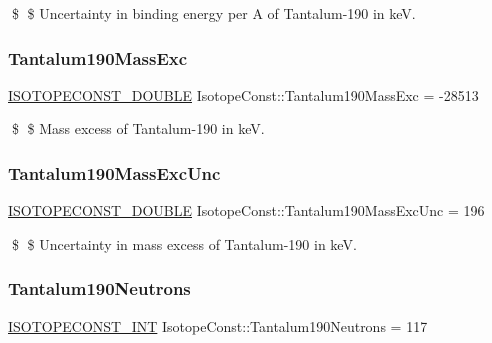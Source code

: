 \$ \$ Uncertainty in binding energy per A of Tantalum-\/190 in keV. \mbox{\label{group___isotope_const-_tantalum-_ta190_ga560f5e161944930704d154cf2fe147cc}} 
\subsubsection{\texorpdfstring{Tantalum190\+Mass\+Exc}{Tantalum190MassExc}}
{\footnotesize\ttfamily \mbox{\hyperlink{group___isotope_const-_macros_ga8f45a7272ce02c0b4c65c44636ed719a}{I\+S\+O\+T\+O\+P\+E\+C\+O\+N\+S\+T\+\_\+\+D\+O\+U\+B\+LE}} Isotope\+Const\+::\+Tantalum190\+Mass\+Exc = -\/28513}

\$ \$ Mass excess of Tantalum-\/190 in keV. \mbox{\label{group___isotope_const-_tantalum-_ta190_ga7cc9103e4e7c105048a300f70400562d}} 
\subsubsection{\texorpdfstring{Tantalum190\+Mass\+Exc\+Unc}{Tantalum190MassExcUnc}}
{\footnotesize\ttfamily \mbox{\hyperlink{group___isotope_const-_macros_ga8f45a7272ce02c0b4c65c44636ed719a}{I\+S\+O\+T\+O\+P\+E\+C\+O\+N\+S\+T\+\_\+\+D\+O\+U\+B\+LE}} Isotope\+Const\+::\+Tantalum190\+Mass\+Exc\+Unc = 196}

\$ \$ Uncertainty in mass excess of Tantalum-\/190 in keV. \mbox{\label{group___isotope_const-_tantalum-_ta190_ga855b94d9ea9ec7ef01bf6d171709fdec}} 
\subsubsection{\texorpdfstring{Tantalum190\+Neutrons}{Tantalum190Neutrons}}
{\footnotesize\ttfamily \mbox{\hyperlink{group___isotope_const-_macros_ga5f18360b3e99483a35c32d789e62621c}{I\+S\+O\+T\+O\+P\+E\+C\+O\+N\+S\+T\+\_\+\+I\+NT}} Isotope\+Const\+::\+Tantalum190\+Neutrons = 117}

